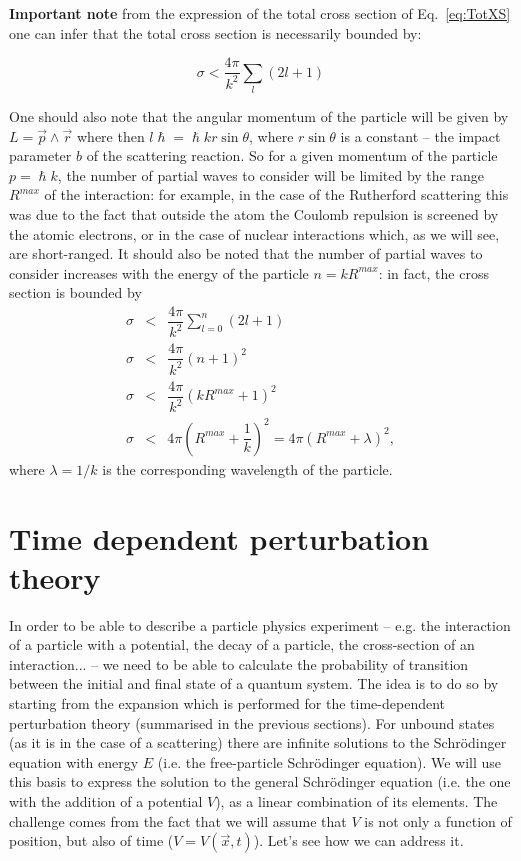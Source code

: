 \vspace{0.5cm}

{\bf Important note} from the expression of the total cross section of Eq.~\ref{eq:TotXS} one can infer that the total cross section is necessarily bounded by:

\begin{equation}
\label{eq:TotXS2}
\sigma < \dfrac{4\pi}{k^2} \sum_l (2l + 1) 
\end{equation}

One should also note that the angular momentum of the particle will be given by $L = \vec{p} \wedge \vec{r}$ where then $l \hslash = \hslash k r \sin \theta$, where $r \sin \theta$ is a constant -- the impact parameter $b$ of the scattering reaction. So for a given momentum of the particle $p = \hslash k$, the number of partial waves to consider will be limited by the range $R
^{max}$ of the interaction: for example, in the case of the Rutherford scattering this was due to the fact that outside the atom the Coulomb repulsion is screened by the atomic electrons, or in the case of nuclear interactions which, as we will see, are short-ranged. It should also be noted that the number of partial waves to consider increases with the energy of the particle $n = k R^{max}$: in fact, the cross section is bounded by
\begin{eqnarray}
\label{eq:TotXS3}
\sigma & < & \dfrac{4\pi}{k^2} \sum_{l=0}^n (2l + 1) \nonumber \\
\sigma  & < & \dfrac{4\pi}{k^2} (n+1)^2 \nonumber \\
\sigma  & < & \dfrac{4\pi}{k^2} (kR^{max} + 1)^2 \nonumber \\
\sigma  & < & 4 \pi \left(R^{max} + \dfrac{1}{k}\right)^2 = 4 \pi (R^{max} + \lambda)^2,
\end{eqnarray}
where $\lambda = 1/k$ is the corresponding wavelength of the particle.


\section{Time dependent perturbation theory}
In order to be able to describe a particle physics experiment -- e.g. the interaction of a particle with a potential, the decay of a particle, the cross-section of an interaction... -- we need to be able to calculate the probability of transition between the initial and final state of a quantum system. The idea is to do so by starting from the expansion which is performed for the time-dependent perturbation theory (summarised in the previous sections). For unbound states (as it is in the case of a scattering) there are infinite solutions to the Schr\"odinger equation with energy $E$ (i.e. the free-particle Schr\"odinger equation). We will use this basis to express the solution to the general Schr\"odinger equation (i.e. the one with the addition of a potential $V$), as a linear combination of its elements. The challenge comes from the fact that we will assume that $V$ is not only a function of position, but also of time ($V=V(\Vec{x},t)$). Let's see how we can address it.

